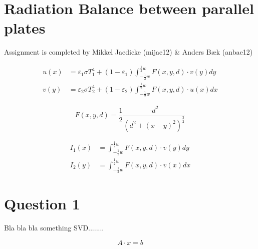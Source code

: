 \section*{Radiation Balance between parallel plates}
Assignment is completed by Mikkel Jaedicke (mijae12) \& Anders Bæk (anbae12)



\begin{equation}
\begin{align*}
u\left( x \right) &=\varepsilon _{ 1 }\sigma { T }_{ 1 }^{ 4 }+\left( 1-\varepsilon _{ 1 } \right) \int _{ -\frac { 1 }{ 2 } w }^{ \frac { 1 }{ 2 } w } F\left( x,y,d \right) \cdot v\left( y \right) { dy }\\ 
v\left( y \right) &=\varepsilon _{ 2 }\sigma { T }_{ 2 }^{ 4 }+\left( 1-\varepsilon _{ 2 } \right) \int _{ -\frac { 1 }{ 2 } w }^{ \frac { 1 }{ 2 } w } F\left( x,y,d \right) \cdot u\left( x \right) { dx }
\end{align*}
\label{eq:ss}
\end{equation}




\begin{equation}
F\left( x,y,d \right) =  \frac {1}{2}\frac {\cdot d^2 }{ \left( d^2+\left( x-y \right)^2 \right)^{\frac{3}{2}}} 
\label{eq:ss}
\end{equation}





\begin{equation}
\begin{align*}
I_{ 1 }\left( x \right) &=\int _{ -\frac { 1 }{ 2 } w }^{ \frac { 1 }{ 2 } w } F\left( x,y,d \right)\cdot v\left( y \right) { dy }
\\
I_{ 2 }\left( y \right) &=\int _{ -\frac { 1 }{ 2 } w }^{ \frac { 1 }{ 2 } w } F\left( x,y,d \right)\cdot v\left( x \right) { dx }
\end{align*}
\label{eq:ss}
\end{equation}


\section*{Question 1}



Bla bla bla something SVD........

\begin{equation}
A \cdot x = b
\label{eq:axb}
\end{equation}

